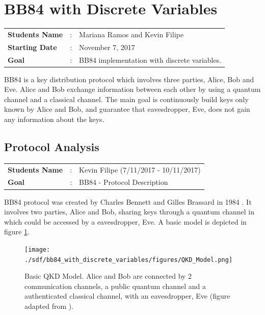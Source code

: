 \clearpage
\section{BB84 with Discrete Variables}

\begin{tcolorbox}	
\begin{tabular}{p{2.75cm} p{0.2cm} p{10.5cm}} 	
\textbf{Students Name}  &:& Mariana Ramos and Kevin Filipe\\
\textbf{Starting Date} &:& November 7, 2017\\
\textbf{Goal}          &:& BB84 implementation with discrete variables.
\end{tabular}
\end{tcolorbox}

BB84 is a key distribution protocol which involves three parties, Alice, Bob and Eve. Alice and Bob exchange information between each other by using a quantum channel and a classical channel. The main goal is continuously build keys only known by Alice and Bob, and guarantee that eavesdropper, Eve, does not gain any information about the keys.


\subsection{Protocol Analysis}
\begin{tcolorbox}	
	\begin{tabular}{p{2.75cm} p{0.2cm} p{10.5cm}} 	
		\textbf{Students Name}  &:& Kevin Filipe (7/11/2017 - 10/11/2017)\\
		\textbf{Goal}          &:& BB84 - Protocol Description
	\end{tabular}
\end{tcolorbox}

BB84 protocol was created by Charles Bennett and Gilles Brassard in 1984 \cite{BB84}. It involves two parties, Alice and Bob, sharing keys through a quantum channel in which could be accessed by a eavesdropper, Eve. A basic model is depicted in figure \ref{fig:qkd model}.

\begin{figure}[H]
	\centering
	\texttt{[image: ./sdf/bb84\_with\_discrete\_variables/figures/QKD\_Model.png]}
	\caption{Basic QKD Model. Alice and Bob are connected by 2 communication channels, a public quantum channel and a authenticated classical channel, with an eavesdropper, Eve (figure adapted from \cite{iqo}).}\label{fig:qkd model}
\end{figure}

